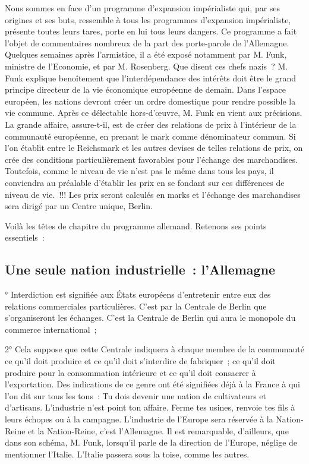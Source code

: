 \documentclass[french,twoside]{book} %
\begin{document}
Nous sommes en face d’un programme d’expansion impérialiste qui, par ses origines et ses buts, ressemble à tous les programmes d’expansion impérialiste, présente toutes leurs tares, porte en lui tous leurs dangers. Ce programme a fait l’objet de commentaires nombreux de la part des porte-parole de l’Allemagne. Quelques semaines après l’armistice, il a été exposé notamment par M. Funk, ministre de l’Economie, et par M. Rosenberg. Que disent ces chefs nazis ? M. Funk explique benoîtement que l’interdépendance des intérêts doit être le grand principe directeur de la vie économique européenne de demain. Dans l’espace européen, les nations devront créer un ordre domestique pour rendre possible la vie commune. Après ce délectable hors-d’œuvre, M. Funk en vient aux précisions. La grande affaire, assure-t-il, est de créer des relations de prix à l’intérieur de la communauté européenne, en prenant le mark comme dénominateur commun. Si l’on établit entre le Reichsmark et les autres devises de telles relations de prix, on crée des conditions particulièrement favorables pour l’échange des marchandises. Toutefois, comme le niveau de vie n’est pas le même dans tous les pays, il conviendra au préalable d’établir les prix en se fondant sur ces différences de niveau de vie. !!! Les prix seront calculés en marks et l’échange des marchandises sera dirigé par un Centre unique, Berlin.\par
Voilà les têtes de chapitre du programme allemand. Retenons ses points essentiels :
\subsection[Une seule nation industrielle : l’Allemagne]{Une seule nation industrielle : l’Allemagne}
° Interdiction est signifiée aux États européens d’entretenir entre eux des relations commerciales particulières. C’est par la Centrale de Berlin que s’organiseront les échanges. C’est la Centrale de Berlin qui aura le monopole du commerce international ;\par
2° Cela suppose que cette Centrale indiquera à chaque membre de la communauté ce qu’il doit produire et ce qu’il doit s’interdire de fabriquer ; ce qu’il doit produire pour la consommation intérieure et ce qu’il doit consacrer à l’exportation. Des indications de ce genre ont été signifiées déjà à la France à qui l’on dit sur tous les tons : Tu dois devenir une nation de cultivateurs et d’artisans. L’industrie n’est point ton affaire. Ferme tes usines, renvoie tes fils à leurs échopes ou à la campagne. L’industrie de l’Europe sera réservée à la Nation-Reine et la Nation-Reine, c’est l’Allemagne. Il est remarquable, d’ailleurs, que dans son schéma, M. Funk, lorsqu’il parle de la direction de l’Europe, néglige de mentionner l’Italie. L’Italie passera sous la toise, comme les autres.
\end{document}
